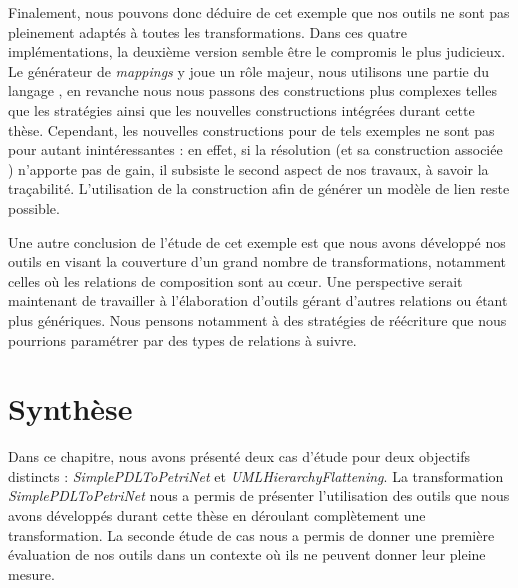 Finalement, nous pouvons donc déduire de cet exemple que nos outils ne sont pas
pleinement adaptés à toutes les transformations. Dans ces quatre
implémentations, la deuxième version semble être le compromis le plus
judicieux. Le générateur de \emph{mappings} y joue un rôle majeur, nous
utilisons une partie du langage {\tom}, en revanche nous nous passons des
constructions plus complexes telles que les stratégies ainsi que les nouvelles
constructions intégrées durant cette thèse. Cependant, les nouvelles
constructions pour de tels exemples ne sont pas pour autant inintéressantes :
en effet, si la résolution (et sa construction associée )
n'apporte pas de gain, il subsiste le second aspect de nos travaux, à savoir la
traçabilité. L'utilisation de la construction  afin de générer
un modèle de lien reste possible.

Une autre conclusion de l'étude de cet exemple est que nous avons
développé nos outils en visant la couverture d'un grand nombre de
transformations, notamment celles où les relations de composition sont au cœur.
Une perspective serait maintenant de travailler à l'élaboration d'outils gérant
d'autres relations ou étant plus génériques. Nous pensons notamment à des
stratégies de réécriture que nous pourrions paramétrer par des types de
relations à suivre.



\section{Synthèse}

Dans ce chapitre, nous avons présenté deux cas d'étude pour deux objectifs
distincts : \emph{SimplePDLToPetriNet} et \emph{UMLHierarchyFlattening}. La
transformation \emph{SimplePDLToPetriNet} nous a permis de présenter
l'utilisation des outils que nous avons développés durant cette thèse en
déroulant complètement une transformation. La seconde étude de cas nous a
permis de donner une première évaluation de nos outils dans un contexte où ils
ne peuvent donner leur pleine mesure.

